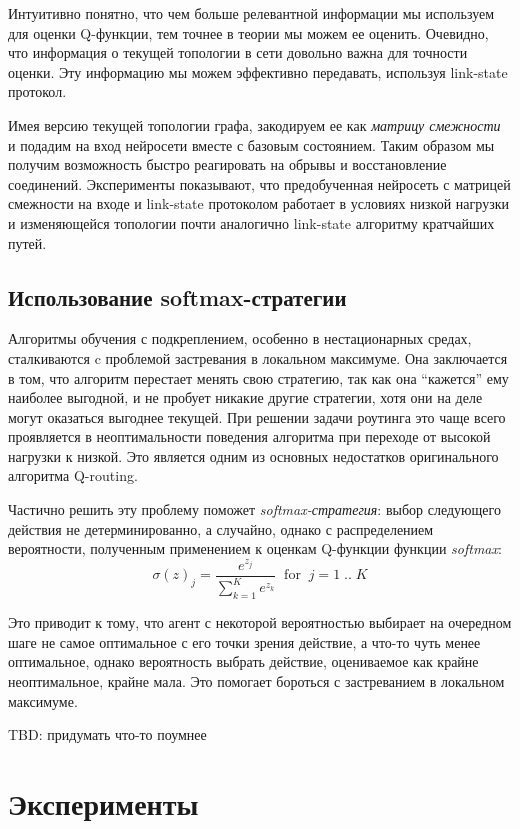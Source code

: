 \documentclass[specification, annotation]{itmo-student-thesis}
\begin{document}
Интуитивно понятно, что чем больше релевантной информации мы используем для
оценки Q-функции, тем точнее в теории мы можем ее оценить. Очевидно, что
информация о текущей топологии в сети довольно важна для точности оценки. Эту
информацию мы можем эффективно передавать, используя link-state протокол.

Имея версию текущей топологии графа, закодируем ее как \textit{матрицу
  смежности} и подадим на вход нейросети вместе с базовым состоянием. Таким
образом мы получим возможность быстро реагировать на обрывы и восстановление
соединений. Эксперименты показывают, что предобученная нейросеть с матрицей
смежности на входе и link-state протоколом работает в условиях низкой нагрузки и
изменяющейся топологии почти аналогично link-state алгоритму кратчайших путей.

\section{Использование softmax-стратегии}

Алгоритмы обучения с подкреплением, особенно в нестационарных средах,
сталкиваются c проблемой застревания в локальном максимуме. Она заключается в
том, что алгоритм перестает менять свою стратегию, так как она ``кажется'' ему
наиболее выгодной, и не пробует никакие другие стратегии, хотя они на деле могут
оказаться выгоднее текущей. При решении задачи роутинга это чаще всего
проявляется в неоптимальности поведения алгоритма при переходе от высокой
нагрузки к низкой. Это является одним из основных недостатков оригинального
алгоритма Q-routing.

Частично решить эту проблему поможет \textit{softmax-стратегия}: выбор
следующего действия не детерминированно, а случайно, однако с распределением
вероятности, полученным применением к оценкам Q-функции функции
\textit{softmax}:
\[
\sigma(z)_j = \frac{e^{z_j}}{\sum_{k=1}^K {e^{z_k}}} \; \; \mathrm{for} \; \; j
= 1 \; .. \; K
\]

Это приводит к тому, что агент с некоторой вероятностью выбирает на очередном
шаге не самое оптимальное с его точки зрения действие, а что-то чуть менее
оптимальное, однако вероятность выбрать действие, оцениваемое как крайне
неоптимальное, крайне мала. Это помогает бороться с застреванием в локальном
максимуме.

TBD: придумать что-то поумнее

\chapter{Эксперименты}
\end{document}
